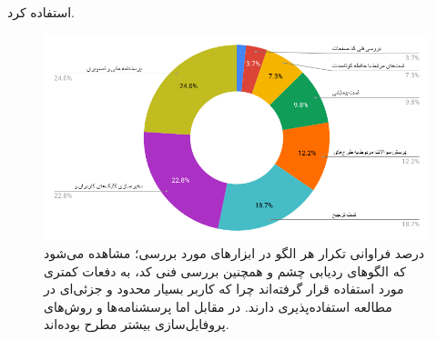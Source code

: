 استفاده کرد.
\begin{figure}[H]
	\centering\includegraphics[width=\linewidth]{Resources/percentage.PNG}
	\caption[درصد فراوانی تکرار هر الگو در ابزارهای مورد بررسی]
	{درصد فراوانی تکرار هر الگو در ابزارهای مورد بررسی؛ مشاهده می‌شود که الگوهای ردیابی چشم و همچنین بررسی فنی کد، به دفعات کمتری مورد استفاده قرار گرفته‌اند چرا که کاربر بسیار محدود و جزئی‌ای در مطالعه استفاده‌پذیری دارند. در مقابل اما پرسشنامه‌ها و روش‌های پروفایل‌سازی بیشتر مطرح بوده‌اند.
	}
	\label{fig:tools_aggregation}
\end{figure}
